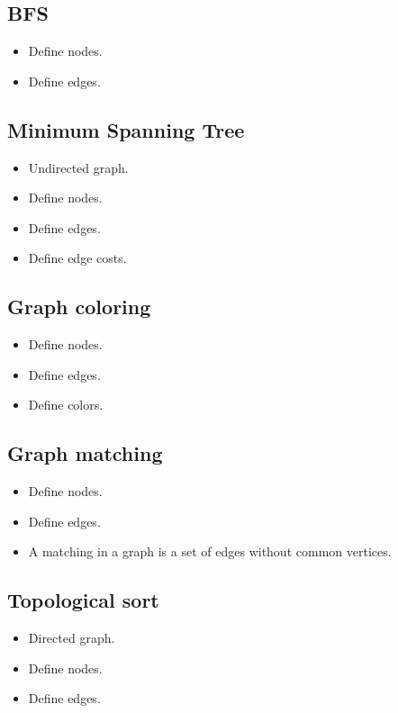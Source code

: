 \documentclass[guide.tex]{subfiles}
\begin{document}
\subsection{BFS}
\begin{itemize}
  \item Define nodes.
  \item Define edges.
\end{itemize}

\subsection{Minimum Spanning Tree}
\begin{itemize}
  \item Undirected graph.
  \item Define nodes.
  \item Define edges.
  \item Define edge costs.
\end{itemize}

\subsection{Graph coloring}
\begin{itemize}
  \item Define nodes.
  \item Define edges.
  \item Define colors.
\end{itemize}

\subsection{Graph matching}
\begin{itemize}
  \item Define nodes.
  \item Define edges.
  \item A matching in a graph is a set of edges without common vertices.
\end{itemize}

\subsection{Topological sort}
\begin{itemize}
  \item Directed graph.
  \item Define nodes.
  \item Define edges.
\end{itemize}
\end{document}
